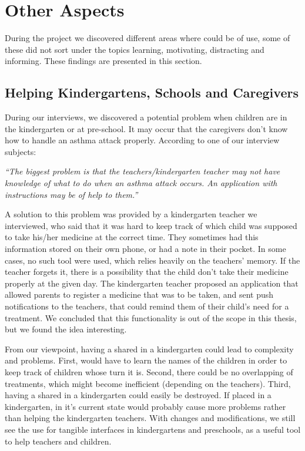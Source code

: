 \section{Other Aspects}
\label{sec:otheraspects}
During the project we discovered different areas where \ab{} could be of use, some of these did not sort under the topics learning, motivating, distracting and informing. These findings are presented in this section.

\subsection{Helping Kindergartens, Schools and Caregivers}
During our interviews, we discovered a potential problem when children are in the kindergarten or at pre-school. It may occur that the caregivers don't know how to handle an asthma attack properly. According to one of our interview subjects: 

\textit{``The biggest problem is that the teachers/kindergarten teacher may not have knowledge of what to do when an asthma attack occurs. An application with instructions may be of help to them.''}

A solution to this problem was provided by a kindergarten teacher we interviewed, who said that it was hard to keep track of which child was supposed to take his/her medicine at the correct time. They sometimes had this information stored on their own phone, or had a note in their pocket. In some cases, no such tool were used, which relies heavily on the teachers' memory. If the teacher forgets it, there is a possibility that the child don't take their medicine properly at the given day. 
The kindergarten teacher proposed an application that allowed parents to register a medicine that was to be taken, and sent push notifications to the teachers, that could remind them of their child's need for a treatment. We concluded that this functionality is out of the scope in this thesis, but we found the idea interesting.         

From our viewpoint, having a shared \buddy{} in a kindergarten could lead to complexity and problems. First, \buddy{} would have to learn the names of the children in order to keep track of children whose turn it is. Second, there could be no overlapping of treatments, which might become inefficient (depending on the teachers). Third, having a shared \buddy{} in a kindergarten could easily be destroyed. If placed in a kindergarten, \buddy{} in it's current state would probably cause more problems rather than helping the kindergarten teachers. With changes and modifications, we still see the use for tangible interfaces in kindergartens and preschools, as a useful tool to help teachers and children.    



